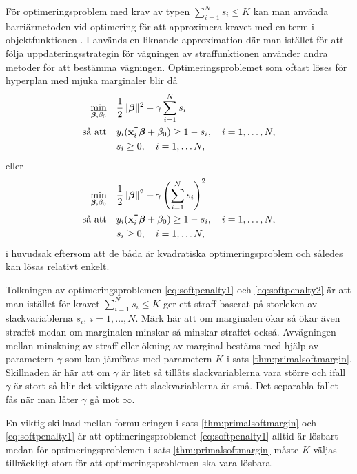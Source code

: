 \documentclass[a4paper, 12pt]{report}
\theoremstyle{definition}
\theoremstyle{remark}
\newcommand{\bfbeta}{{\boldsymbol{\beta}}}
\begin{document}
För optimeringsproblem med krav av typen $\sum_{i=1}^{N}s_i\leq K$ kan man använda barriärmetoden vid optimering för att approximera kravet med en term i objektfunktionen \cite{Boyd}. I \cite{CortesVapnik} används en liknande approximation där man istället för att följa uppdateringsstrategin för vägningen av straffunktionen använder andra metoder för att bestämma vägningen. Optimeringsproblemet som oftast löses för hyperplan med mjuka marginaler blir då
\begin{equation}\label{eq:softpenalty1}
\begin{aligned}
	\operatornamewithlimits{min}_{\bfbeta,\beta_0} & & &\frac{1}{2}\|\bfbeta\|^2 + \gamma\sum_{i=1}^{N} s_i\\
	\text{så att} & & &y_i(\mathbf{x}_i^\intercal\bfbeta+\beta_0)\geq 1 - s_i,\quad i=1,\dots,N,\\
	& & &s_i\geq0,\quad i=1,\dots N,
\end{aligned}
\end{equation}
eller
\begin{equation}\label{eq:softpenalty2}
\begin{aligned}
\operatornamewithlimits{min}_{\bfbeta,\beta_0} & & &\frac{1}{2}\|\bfbeta\|^2 + \gamma\left(\sum_{i=1}^{N} s_i\right)^2\\
\text{så att} & & &y_i(\mathbf{x}_i^\intercal\bfbeta+\beta_0)\geq 1 - s_i,\quad i=1,\dots,N,\\
& & &s_i\geq0,\quad i=1,\dots N,
\end{aligned}
\end{equation}
i huvudsak eftersom att de båda är kvadratiska optimeringsproblem och således kan lösas relativt enkelt.

Tolkningen av optimeringsproblemen \ref{eq:softpenalty1} och \ref{eq:softpenalty2} är att man istället för kravet $\sum_{i=1}^{N}s_i\leq K$ ger ett straff baserat på storleken av slackvariablerna $s_i,~i=1,\dots,N$. Märk här att om marginalen ökar så ökar även straffet medan om marginalen minskar så minskar straffet också. Avvägningen mellan minskning av straff eller ökning av marginal bestäms med hjälp av parametern $\gamma$ som kan jämföras med parametern $K$ i sats \ref{thm:primalsoftmargin}. Skillnaden är här att om $\gamma$ är litet så tillåts slackvariablerna vara större och ifall $\gamma$ är stort så blir det viktigare att slackvariablerna är små. Det separabla fallet fås när man låter $\gamma$ gå mot $\infty$.

En viktig skillnad mellan formuleringen i sats \ref{thm:primalsoftmargin} och \ref{eq:softpenalty1} är att optimeringsproblemet \ref{eq:softpenalty1} alltid är lösbart medan för optimeringsproblemen i sats \ref{thm:primalsoftmargin} måste $K$ väljas tillräckligt stort för att optimeringsproblemen ska vara lösbara.
\end{document}

